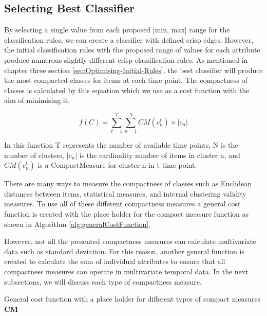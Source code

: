 \subsection{Selecting Best Classifier}
\label{sec:Selecting-Best-Classifier}
By selecting a single value from each proposed [min, max] range for the classification rules, we can create a classifier with defined crisp edges. However, the initial classification rules with the proposed range of values for each attribute produce numerous slightly different crisp classification rules. As mentioned in chapter three section  \ref{sec:Optimising-Initial-Rules}, the best classifier will produce the most compacted classes for items at each time point. The compactness of classes is calculated by this equation which we use as a cost function with the aim of minimising it.

\begin{equation}
f(C) = \sum_{t=1}^{T} \sum_{n=1}^{N} CM(c_{n}^{t}) \times \left | c_{n} \right |
\end{equation}

In this function T represents the number of available time points, N is the number of clusters,  $\left | c_{n} \right |$ is the cardinality number of items in cluster n, and $CM(c_{n}^{t})$ is a \gls{CompactMeasure} for cluster n in t time point.

There are many ways to measure the compactness of classes such as Euclidean distances between items, statistical measures, and internal clustering validity measures. To use all of these different compactness measures a general cost function is created with the place holder for the compact measure function as shown in Algorithm \ref{alg:generalCostFunction}. 

However, not all the presented compactness measures can calculate multivariate data such as standard deviation. For this reason, another general function is created to calculate the sum of individual attributes to ensure that all compactness measures can operate in multivariate temporal data. In the next subsections, we will discuss each type of compactness measure.


\begin{algorithm}[!h]
    \SetAlgoLined
    
    \caption{General cost function with a place holder for different types of compact measures \textbf{CM}}
    \label{alg:generalCostFunction}
\end{algorithm}



